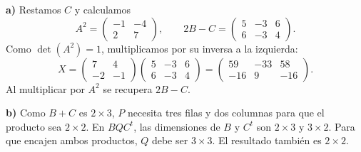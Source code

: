 \textbf{a)} Restamos $C$ y calculamos
\[
A^2=\begin{pmatrix}-1&-4\\2&7\end{pmatrix},\qquad
2B-C=\begin{pmatrix}5&-3&6\\6&-3&4\end{pmatrix}.
\]
Como $\det(A^2)=1$, multiplicamos por su inversa a la izquierda:
\[
X=\begin{pmatrix}7&4\\-2&-1\end{pmatrix}
\begin{pmatrix}5&-3&6\\6&-3&4\end{pmatrix}
=\boxed{\begin{pmatrix}59&-33&58\\-16&9&-16\end{pmatrix}}.
\]
Al multiplicar por $A^2$ se recupera $2B-C$.

\textbf{b)} Como $B+C$ es $2\times3$, $P$ necesita tres filas
y dos columnas para que el producto sea $2\times2$.
En $BQC^t$, las dimensiones de $B$ y $C^t$ son $2\times3$
y $3\times2$. Para que encajen ambos productos, $Q$ debe ser
$3\times3$. El resultado también es $2\times2$.
